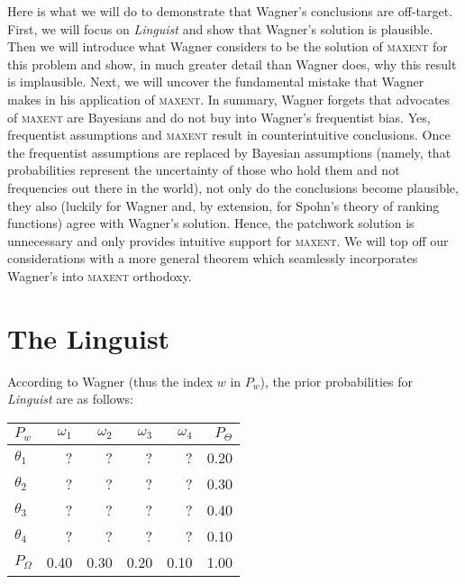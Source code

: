 \documentclass[11pt]{article}
\begin{document}
Here is what we will do to demonstrate that Wagner's conclusions are
off-target. First, we will focus on \emph{Linguist} and show that
Wagner's solution is plausible. Then we will introduce what Wagner
considers to be the solution of \textsc{maxent} for this problem and
show, in much greater detail than Wagner does, why this result is
implausible. Next, we will uncover the fundamental mistake that Wagner
makes in his application of \textsc{maxent}. In summary, Wagner
forgets that advocates of \textsc{maxent} are Bayesians and do not buy
into Wagner's frequentist bias. Yes, frequentist assumptions and
\textsc{maxent} result in counterintuitive conclusions. Once the
frequentist assumptions are replaced by Bayesian assumptions (namely,
that probabilities represent the uncertainty of those who hold them
and not frequencies out there in the world), not only do the
conclusions become plausible, they also (luckily for Wagner and, by
extension, for Spohn's theory of ranking functions) agree with
Wagner's solution. Hence, the patchwork solution is unnecessary and
only provides intuitive support for \textsc{maxent}. We will top off
our considerations with a more general theorem which seamlessly
incorporates Wagner's   into \textsc{maxent}
orthodoxy.

\section{The Linguist}
\label{TheLinguist}

According to Wagner (thus the index $w$ in $P_{w}$), the prior
probabilities for \emph{Linguist} are as follows:

\medskip

\begin{tabular}{|l|r|r|r|r|r|}\hline
  $P_{w}$ & $\omega_{1}$ & $\omega_{2}$ & $\omega_{3}$ & $\omega_{4}$ & $P_{\Theta}$ \\ \hline
$\theta_{1}$ & ? & ? & ? & ? & 0.20 \\ \hline
$\theta_{2}$ & ? & ? & ? & ? & 0.30 \\ \hline
$\theta_{3}$ & ? & ? & ? & ? & 0.40 \\ \hline
$\theta_{4}$ & ? & ? & ? & ? & 0.10 \\ \hline
$P_{\Omega}$ & 0.40 & 0.30 & 0.20 & 0.10 & 1.00\\ \hline
\end{tabular}

\medskip
\end{document}

